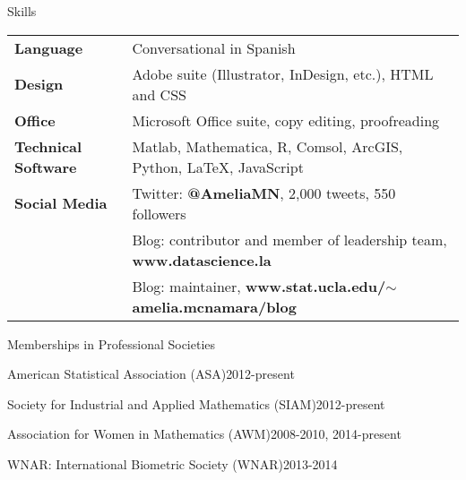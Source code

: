 \documentclass{resume} %
\begin{document}
\begin{rSection}{Skills}

\begin{tabular}{ @{} >{\bfseries}l @{\hspace{6ex}} l }
Language & Conversational in Spanish \\
Design & Adobe suite (Illustrator, InDesign, etc.), %
HTML and CSS \\
Office & Microsoft Office suite, copy editing, proofreading %
 \\
Technical Software & Matlab, Mathematica, R, Comsol, ArcGIS, Python, LaTeX, JavaScript \\
Social Media & Twitter: \textbf{@AmeliaMN}, 2,000 tweets, 550 followers \\
 & Blog: contributor and member of leadership team, \textbf{www.datascience.la} \\
 & Blog: maintainer, \textbf{www.stat.ucla.edu/$\sim$amelia.mcnamara/blog}
\end{tabular}
\end{rSection}



\begin{rSection}{Memberships in Professional Societies}
\begin{esSubsection}{American Statistical Association }{(ASA)}{2012-present}{}{}
\end{esSubsection}

\begin{esSubsection}{Society for Industrial and Applied Mathematics }{(SIAM)}{2012-present}{}{}
\end{esSubsection}

\begin{esSubsection}{Association for Women in Mathematics }{(AWM)}{2008-2010, 2014-present}{}{}
\end{esSubsection}

\begin{esSubsection}{WNAR: International Biometric Society }{(WNAR)}{2013-2014}{}{}
\end{esSubsection}


\end{rSection}
\end{document}
